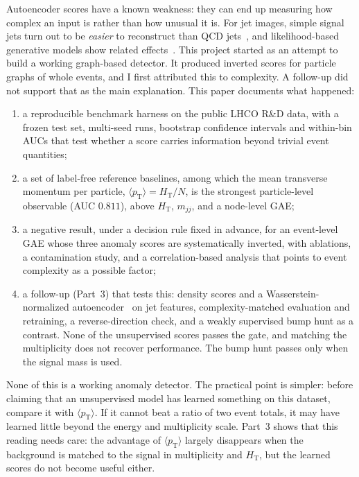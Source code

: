 \documentclass[11pt,a4paper]{article}
\newcommand{\pt}{\ensuremath{p_\mathrm{T}}\xspace}
\newcommand{\HT}{\ensuremath{H_\mathrm{T}}\xspace}
\newcommand{\mjj}{\ensuremath{m_{jj}}\xspace}
\newcommand{\ptmean}{\ensuremath{\langle \pt \rangle}\xspace}
\begin{document}
Autoencoder scores have a known weakness: they can end up measuring how complex an input is
rather than how unusual it is. For jet images, simple signal jets turn out to be \emph{easier} to
reconstruct than QCD jets~\cite{Finke:2021sdf}, and likelihood-based generative models show related
effects~\cite{Nalisnick:2018dgm,Serra:2019ocd}. This project started as an attempt to build a
working graph-based detector. It produced inverted scores for particle graphs of whole events, and I first
attributed this to complexity. A follow-up did not support that as the main explanation.
This paper documents what happened:
\begin{enumerate}
  \item a reproducible benchmark harness on the public LHCO R\&D data, with a frozen test set,
        multi-seed runs, bootstrap confidence intervals and within-bin AUCs that test whether
        a score carries information beyond trivial event quantities;
  \item a set of label-free reference baselines, among which the mean transverse momentum per
        particle, $\ptmean=\HT/N$, is the strongest particle-level observable
        (AUC $0.811$), above \HT, \mjj, and a node-level GAE;
  \item a negative result, under a decision rule fixed in advance, for an event-level GAE whose three anomaly scores are
        systematically inverted, with ablations, a contamination study, and a correlation-based
        analysis that points to event complexity as a possible factor;
  \item a follow-up (Part~3) that tests this: density scores and a Wasserstein-normalized
        autoencoder~\cite{CMS:2025lmn} on jet features, complexity-matched evaluation and retraining, a
        reverse-direction check, and a weakly supervised bump hunt as a contrast. None of the
        unsupervised scores passes the gate, and matching the multiplicity does not recover
        performance. The bump hunt passes only when the signal mass is used.
\end{enumerate}
None of this is a working anomaly detector. The practical point is simpler: before claiming that
an unsupervised model has learned something on this dataset, compare it with \ptmean. If it cannot
beat a ratio of two event totals, it may have learned little beyond the energy and multiplicity scale.
Part~3 shows that this reading needs care: the advantage of \ptmean largely disappears when
the background is matched to the signal in multiplicity and \HT, but the learned scores do not
become useful either.
\end{document}
